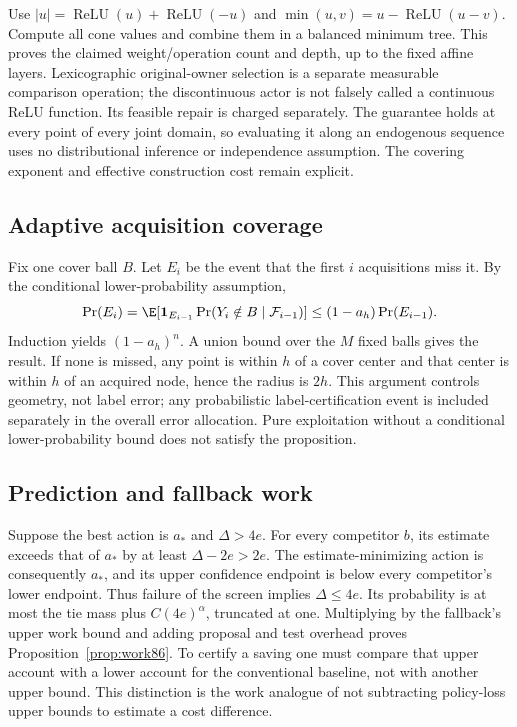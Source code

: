 Use $|u|=\operatorname{ReLU}(u)+\operatorname{ReLU}(-u)$ and $\min(u,v)=u-\operatorname{ReLU}(u-v)$. Compute all cone values and combine them in a balanced minimum tree. This proves the claimed weight/operation count and depth, up to the fixed affine layers. Lexicographic original-owner selection is a separate measurable comparison operation; the discontinuous actor is not falsely called a continuous ReLU function. Its feasible repair is charged separately. The guarantee holds at every point of every joint domain, so evaluating it along an endogenous sequence uses no distributional inference or independence assumption. The covering exponent and effective construction cost remain explicit.

\subsection{Adaptive acquisition coverage}
Fix one cover ball $B$. Let $E_i$ be the event that the first $i$ acquisitions miss it. By the conditional lower-probability assumption,
\[
 \Pr(E_i)=\E[\mathbf1_{E_{i-1}}\Pr(Y_i\notin B\mid\mathcal F_{i-1})]
 \le(1-a_h)\Pr(E_{i-1}).
\]
Induction yields $(1-a_h)^n$. A union bound over the $M$ fixed balls gives the result. If none is missed, any point is within $h$ of a cover center and that center is within $h$ of an acquired node, hence the radius is $2h$. This argument controls geometry, not label error; any probabilistic label-certification event is included separately in the overall error allocation. Pure exploitation without a conditional lower-probability bound does not satisfy the proposition.

\subsection{Prediction and fallback work}
Suppose the best action is $a_*$ and $\Delta>4e$. For every competitor $b$, its estimate exceeds that of $a_*$ by at least $\Delta-2e>2e$. The estimate-minimizing action is consequently $a_*$, and its upper confidence endpoint is below every competitor's lower endpoint. Thus failure of the screen implies $\Delta\le4e$. Its probability is at most the tie mass plus $C(4e)^\alpha$, truncated at one. Multiplying by the fallback's upper work bound and adding proposal and test overhead proves Proposition~\ref{prop:work86}. To certify a saving one must compare that upper account with a lower account for the conventional baseline, not with another upper bound. This distinction is the work analogue of not subtracting policy-loss upper bounds to estimate a cost difference.

